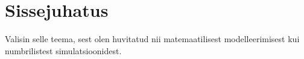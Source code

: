 \chapter{Sissejuhatus}
Valisin selle teema, sest olen huvitatud nii matemaatilisest modelleerimisest kui numbrilistest simulatsioonidest. \cite{Engelbrecht2021}